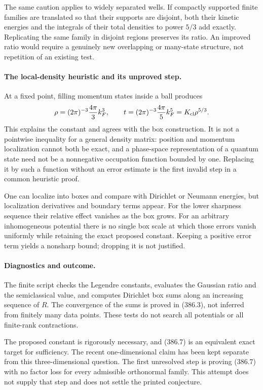 \documentclass[11pt]{article}
\begin{document}
The same caution applies to widely separated wells. If compactly
supported finite families are translated so that their supports
are disjoint, both their kinetic energies and the integrals of
their total densities to power $5/3$ add exactly. Replicating the
same family in disjoint regions preserves its ratio. An improved
ratio would require a genuinely new overlapping or many-state
structure, not repetition of an existing test.

\paragraph{The local-density heuristic and its unproved step.}
At a fixed point, filling momentum states inside a ball produces
\[
 \rho=(2\pi)^{-3}\frac{4\pi}{3}k_F^3,\qquad
 t=(2\pi)^{-3}\frac{4\pi}{5}k_F^5
       =K_{\rm cl}\rho^{5/3}.
\]
This explains the constant and agrees with the box construction.
It is not a pointwise inequality for a general density matrix:
position and momentum localization cannot both be exact, and a
phase-space representation of a quantum state need not be a
nonnegative occupation function bounded by one. Replacing it by
such a function without an error estimate is the first invalid
step in a common heuristic proof.

One can localize into boxes and compare with Dirichlet or Neumann
energies, but localization derivatives and boundary terms appear.
For the lower sharpness sequence their relative effect vanishes as
the box grows. For an arbitrary inhomogeneous potential there is
no single box scale at which those errors vanish uniformly while
retaining the exact proposed constant. Keeping a positive error
term yields a nonsharp bound; dropping it is not justified.

\paragraph{Diagnostics and outcome.}
The finite script checks the Legendre constants, evaluates the
Gaussian ratio and the semiclassical value, and computes Dirichlet
box sums along an increasing sequence of $R$. The convergence of
the sums is proved in (386.3), not inferred from finitely many data
points. These tests do not search all potentials or all finite-rank
contractions.

The proposed constant is rigorously necessary, and (386.7) is an
equivalent exact target for sufficiency. The recent one-dimensional
claim has been kept separate from this three-dimensional question.
The first unresolved step is proving (386.7) with no factor loss
for every admissible orthonormal family. This attempt does not
supply that step and does not settle the printed conjecture.
\end{document}
